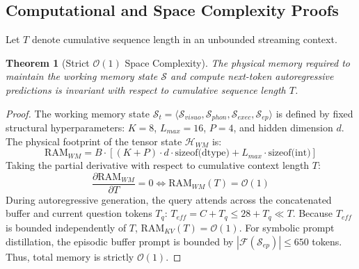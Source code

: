 \documentclass[11pt,a4paper]{article}
\newtheorem{theorem}{Theorem}
\begin{document}
\subsection{Computational and Space Complexity Proofs}

Let $T$ denote cumulative sequence length in an unbounded streaming context.

\begin{theorem}[Strict $\mathcal{O}(1)$ Space Complexity]
The physical memory required to maintain the working memory state $\mathcal{S}$ and compute next-token autoregressive predictions is invariant with respect to cumulative sequence length $T$.
\end{theorem}
\begin{proof}
The working memory state $\mathcal{S}_t = \langle \mathcal{S}_{visuo}, \mathcal{S}_{phon}, \mathcal{S}_{exec}, \mathcal{S}_{ep} \rangle$ is defined by fixed structural hyperparameters: $K=8$, $L_{max}=16$, $P=4$, and hidden dimension $d$. The physical footprint of the tensor state $\mathcal{H}_{WM}$ is:
\begin{equation}
\text{RAM}_{WM} = B \cdot \left[ (K + P) \cdot d \cdot \text{sizeof(dtype)} + L_{max} \cdot \text{sizeof(int)} \right]
\end{equation}
Taking the partial derivative with respect to cumulative context length $T$:
\begin{equation}
\frac{\partial \text{RAM}_{WM}}{\partial T} = 0 \iff \text{RAM}_{WM}(T) = \mathcal{O}(1)
\end{equation}
During autoregressive generation, the query attends across the concatenated buffer and current question tokens $T_q$: $T_{eff} = C + T_q \le 28 + T_q \ll T$. Because $T_{eff}$ is bounded independently of $T$, $\text{RAM}_{KV}(T) = \mathcal{O}(1)$. For symbolic prompt distillation, the episodic buffer prompt is bounded by $|\mathcal{F}(\mathcal{S}_{ep})| \le 650$ tokens. Thus, total memory is strictly $\mathcal{O}(1)$.
\end{proof}
\end{document}
